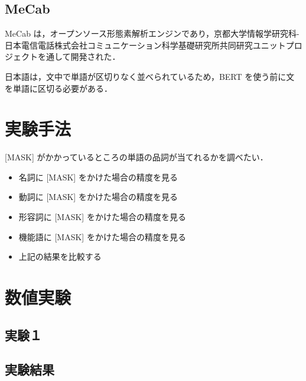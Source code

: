\documentclass[twocolumn]{jarticle}
\begin{document}
  \subsection{MeCab}
  MeCab は，オープンソース形態素解析エンジンであり，京都大学情報学研究科-日本電信電話株式会社コミュニケーション科学基礎研究所共同研究ユニットプロジェクトを通して開発された．
  \par
  日本語は，文中で単語が区切りなく並べられているため，BERT を使う前に文を単語に区切る必要がある．
  \par

\section{実験手法}

[MASK] がかかっているところの単語の品詞が当てれるかを調べたい．
\begin{itemize}
  \item 名詞に [MASK] をかけた場合の精度を見る
  \item 動詞に [MASK] をかけた場合の精度を見る
  \item 形容詞に [MASK] をかけた場合の精度を見る
  \item 機能語に [MASK] をかけた場合の精度を見る
  \item 上記の結果を比較する
\end{itemize}


\section{数値実験}
  \subsection{実験１}

  \subsection{実験結果}
\end{document}
